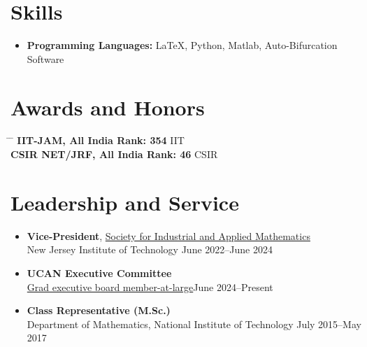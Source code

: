 \documentclass[11pt,a4paper]{article}
\begin{document}
\section*{Skills}
\begin{itemize}[noitemsep]
    \item \textbf{Programming Languages:} \LaTeX, Python, Matlab, Auto-Bifurcation Software
\end{itemize}

\vspace{10pt}

\section*{Awards and Honors}
\begin{tabbing}
\hspace{3.5in} \= \hspace{2.0in} \= \kill
\textbf{IIT-JAM, All India Rank: 354} \> IIT  \\
\textbf{CSIR NET/JRF, All India Rank: 46} \> CSIR  \\
\end{tabbing}

\vspace{10pt}

\section*{Leadership and Service}
\begin{itemize}[noitemsep]
    \item \textbf{Vice-President}, \href{https://sites.google.com/site/mathscigroup/home?authuser=0}{Society for Industrial and Applied Mathematics}\\
    New Jersey Institute of Technology \hfill June 2022--June 2024
    \item \textbf{UCAN Executive Committee}\\
    \href{https://ucanaft.org/executive-committee/} {Grad executive board member-at-large}\hfill June 2024--Present
    \item \textbf{Class Representative (M.Sc.)}\\
    Department of Mathematics, National Institute of Technology \hfill July 2015--May 2017
\end{itemize}

\vspace{10pt}
\end{document}
